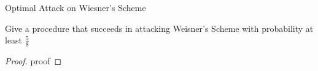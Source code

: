 \begin{solution}{Optimal Attack on Wiesner’s Scheme}\label{ques:x}
    \begin{question}
    Give a procedure that succeeds in attacking Weisner's Scheme with probability at least $\frac{5}{8}$ 
    \end{question}
    \tcblower{}
    \begin{proof}
    proof
    \end{proof}
\end{solution}
 